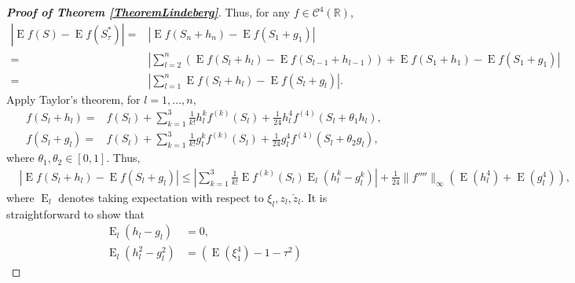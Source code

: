 \documentclass[11pt]{article}
\DeclareMathOperator{\myE}{E}
\theoremstyle{plain}
\theoremstyle{definition}
\theoremstyle{remark}
\begin{document}
\begin{proof}[\textbf{Proof of Theorem \ref{TheoremLindeberg}}]
    Thus, for any $f \in \mathscr C^4 (\mathbb R)$,
    \begin{equation*}
        \begin{split}
        \left|\myE f\left(S\right)
        -
        \myE f\left(S_\tau^*\right)\right| 
        =&
        \left| \myE f(S_n+h_n)-\myE f(S_1+g_1)\right|
        \\
        =&
        \left|\sum_{l=2}^{n} \left(\myE f(S_{l}+h_{l})-\myE f(S_{l-1}+h_{l-1})\right)+\myE f(S_{1}+h_{1})-\myE f(S_{1}+g_{1})\right|
        \\
        = &
       \left| \sum_{l=1}^{n} \myE f(S_{l}+h_{l})-\myE f(S_{l}+g_{l})\right|
       .
        \end{split}
    \end{equation*}
    Apply Taylor's theorem, for $l=1,\ldots,n$,
    \begin{equation*}
        \begin{split}
            f(S_{l}+h_{l})=&
            f(S_{l})
            +
            \sum_{k=1}^3
            \frac{1}{k!} h_l^k f^{(k)} (S_{l})
            +
            \frac{1}{24}h_{l}^4 f^{(4)} (S_{l}+\theta_1 h_{l}),
            \\
            f(S_{l}+g_{l})=&
            f(S_{l})
            +
            \sum_{k=1}^3
            \frac{1}{k!} g_l^k f^{(k)} (S_{l})
            +
            \frac{1}{24}g_{l}^4 f^{(4)} (S_{l}+\theta_{2} g_{l}),
        \end{split}
    \end{equation*}
    where $\theta_1,\theta_2\in[0,1]$.
    Thus,
    \begin{equation*}
        \begin{split}
             &\left| \myE f(S_{l}+h_{l})-\myE f(S_{l}+g_{l})\right|
\leq
\left|
            \sum_{k=1}^3
            \frac{1}{k!} \myE f^{(k)} (S_{l})
            \myE_l (h_l^k - g_l^k)
            \right|
            +
            \frac{1}{24} \|f'''' \|_{\infty} \left(\myE (h_{l}^4)+\myE (g_{l}^4)\right),
        \end{split}
    \end{equation*}
where $\myE_l$ denotes taking expectation with respect to $\xi_l, z_l ,\check z_l$.
It is straightforward to show that
\begin{equation*}
    \begin{split}
        \myE_l (h_l-g_l)&=0, 
        \\
        \myE_l (h_l^2-g_l^2)&= 
        \left(
            \myE (\xi_1^4) - 1
            -
            \tau^2
        \right)

\end{split}
\end{equation*}
\end{proof}
\end{document}
